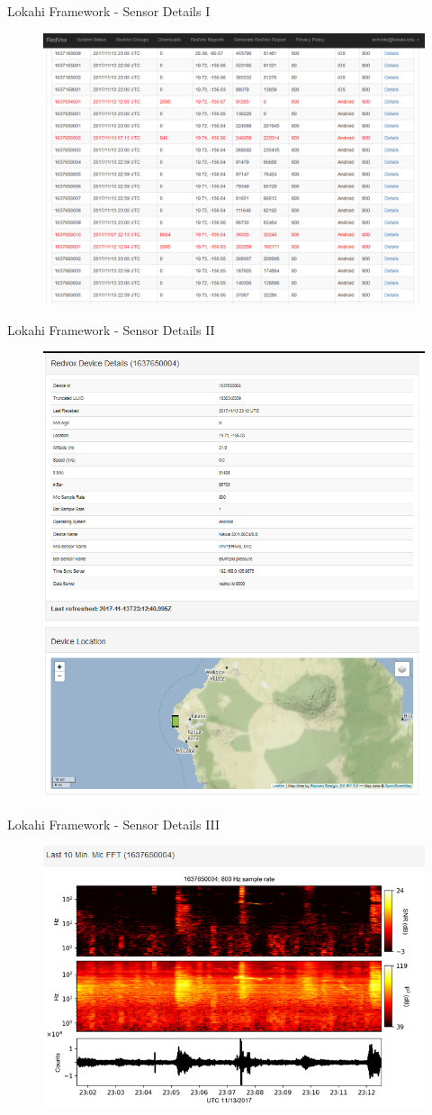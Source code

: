 \documentclass{beamer}
\begin{document}
\begin{frame}{Lokahi Framework - Sensor Details I}
\begin{figure}
	\includegraphics[width=.95\textwidth]{img/redvox1.png}
\end{figure}
\end{frame}

\begin{frame}{Lokahi Framework - Sensor Details II}
\begin{figure}
	\includegraphics[width=.60\textwidth]{img/redvox2.png}
\end{figure}
\end{frame}

\begin{frame}{Lokahi Framework - Sensor Details III}
\begin{figure}
	\includegraphics[width=.60\textwidth]{img/redvox3.png}
\end{figure}
\end{frame}
\end{document}

